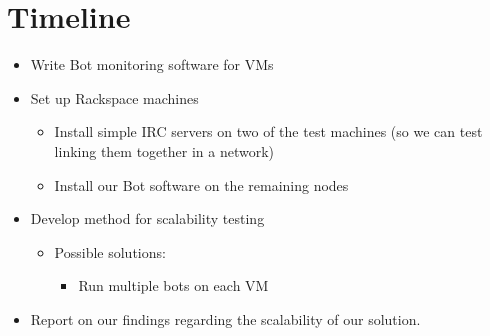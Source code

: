 \documentclass{article}
\begin{document}
\section*{Timeline}
\begin{itemize}
\item Write Bot monitoring software for VMs
\item Set up Rackspace machines
    \begin{itemize}
    \item Install simple IRC servers on two of the test machines (so we can test
    linking them together in a network)
    \item Install our Bot software on the remaining nodes
    \end{itemize}
\item Develop method for scalability testing
    \begin{itemize}
    \item Possible solutions:
        \begin{itemize}
        \item Run multiple bots on each VM
        \end{itemize}
    \end{itemize}
\item Report on our findings regarding the scalability of our solution.
\end{itemize}
\end{document}
